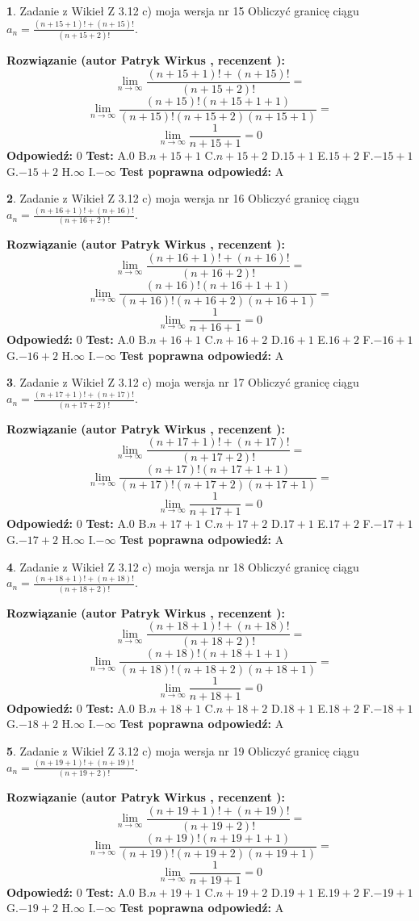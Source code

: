 \documentclass[12pt, a4paper]{article}
\theoremstyle{definition} %
\newtheorem{zad}{}
\newcommand{\zadStart}[1]{\begin{zad}#1\newline}
\newcommand{\zadStop}{\end{zad}}
\newcommand{\rozwStart}[2]{\noindent \textbf{Rozwiązanie (autor #1 , recenzent #2): }\newline}
\newcommand{\rozwStop}{\newline}
\newcommand{\odpStart}{\noindent \textbf{Odpowiedź:}\newline}
\newcommand{\odpStop}{\newline}
\newcommand{\testStart}{\noindent \textbf{Test:}\newline}
\newcommand{\testStop}{\newline}
\newcommand{\kluczStart}{\noindent \textbf{Test poprawna odpowiedź:}\newline}
\newcommand{\kluczStop}{\newline}
\begin{document}
\zadStart{Zadanie z Wikieł Z 3.12 c) moja wersja nr 15}
Obliczyć granicę ciągu $a_{n}=\frac{(n+15+1)!+(n+15)!}{(n+15+2)!}$.
\zadStop
\rozwStart{Patryk Wirkus}{}
$$\lim\limits_{n\to\infty}\frac{(n+15+1)!+(n+15)!}{(n+15+2)!}=$$
$$\lim\limits_{n\to\infty}\frac{(n+15)!(n+15+1+1)}{(n+15)!(n+15+2)(n+15+1)}=$$
$$\lim\limits_{n\to\infty}\frac{1}{n+15+1}= 0$$
\rozwStop
\odpStart
$0$
\odpStop
\testStart
A.$0$
B.$n+15+1$
C.$n+15+2$
D.$15+1$
E.$15+2$
F.$-15+1$
G.$-15+2$
H.$\infty$
I.$-\infty$
\testStop
\kluczStart
A
\kluczStop



\zadStart{Zadanie z Wikieł Z 3.12 c) moja wersja nr 16}
Obliczyć granicę ciągu $a_{n}=\frac{(n+16+1)!+(n+16)!}{(n+16+2)!}$.
\zadStop
\rozwStart{Patryk Wirkus}{}
$$\lim\limits_{n\to\infty}\frac{(n+16+1)!+(n+16)!}{(n+16+2)!}=$$
$$\lim\limits_{n\to\infty}\frac{(n+16)!(n+16+1+1)}{(n+16)!(n+16+2)(n+16+1)}=$$
$$\lim\limits_{n\to\infty}\frac{1}{n+16+1}= 0$$
\rozwStop
\odpStart
$0$
\odpStop
\testStart
A.$0$
B.$n+16+1$
C.$n+16+2$
D.$16+1$
E.$16+2$
F.$-16+1$
G.$-16+2$
H.$\infty$
I.$-\infty$
\testStop
\kluczStart
A
\kluczStop



\zadStart{Zadanie z Wikieł Z 3.12 c) moja wersja nr 17}
Obliczyć granicę ciągu $a_{n}=\frac{(n+17+1)!+(n+17)!}{(n+17+2)!}$.
\zadStop
\rozwStart{Patryk Wirkus}{}
$$\lim\limits_{n\to\infty}\frac{(n+17+1)!+(n+17)!}{(n+17+2)!}=$$
$$\lim\limits_{n\to\infty}\frac{(n+17)!(n+17+1+1)}{(n+17)!(n+17+2)(n+17+1)}=$$
$$\lim\limits_{n\to\infty}\frac{1}{n+17+1}= 0$$
\rozwStop
\odpStart
$0$
\odpStop
\testStart
A.$0$
B.$n+17+1$
C.$n+17+2$
D.$17+1$
E.$17+2$
F.$-17+1$
G.$-17+2$
H.$\infty$
I.$-\infty$
\testStop
\kluczStart
A
\kluczStop



\zadStart{Zadanie z Wikieł Z 3.12 c) moja wersja nr 18}
Obliczyć granicę ciągu $a_{n}=\frac{(n+18+1)!+(n+18)!}{(n+18+2)!}$.
\zadStop
\rozwStart{Patryk Wirkus}{}
$$\lim\limits_{n\to\infty}\frac{(n+18+1)!+(n+18)!}{(n+18+2)!}=$$
$$\lim\limits_{n\to\infty}\frac{(n+18)!(n+18+1+1)}{(n+18)!(n+18+2)(n+18+1)}=$$
$$\lim\limits_{n\to\infty}\frac{1}{n+18+1}= 0$$
\rozwStop
\odpStart
$0$
\odpStop
\testStart
A.$0$
B.$n+18+1$
C.$n+18+2$
D.$18+1$
E.$18+2$
F.$-18+1$
G.$-18+2$
H.$\infty$
I.$-\infty$
\testStop
\kluczStart
A
\kluczStop



\zadStart{Zadanie z Wikieł Z 3.12 c) moja wersja nr 19}
Obliczyć granicę ciągu $a_{n}=\frac{(n+19+1)!+(n+19)!}{(n+19+2)!}$.
\zadStop
\rozwStart{Patryk Wirkus}{}
$$\lim\limits_{n\to\infty}\frac{(n+19+1)!+(n+19)!}{(n+19+2)!}=$$
$$\lim\limits_{n\to\infty}\frac{(n+19)!(n+19+1+1)}{(n+19)!(n+19+2)(n+19+1)}=$$
$$\lim\limits_{n\to\infty}\frac{1}{n+19+1}= 0$$
\rozwStop
\odpStart
$0$
\odpStop
\testStart
A.$0$
B.$n+19+1$
C.$n+19+2$
D.$19+1$
E.$19+2$
F.$-19+1$
G.$-19+2$
H.$\infty$
I.$-\infty$
\testStop
\kluczStart
A
\kluczStop
\end{document}

